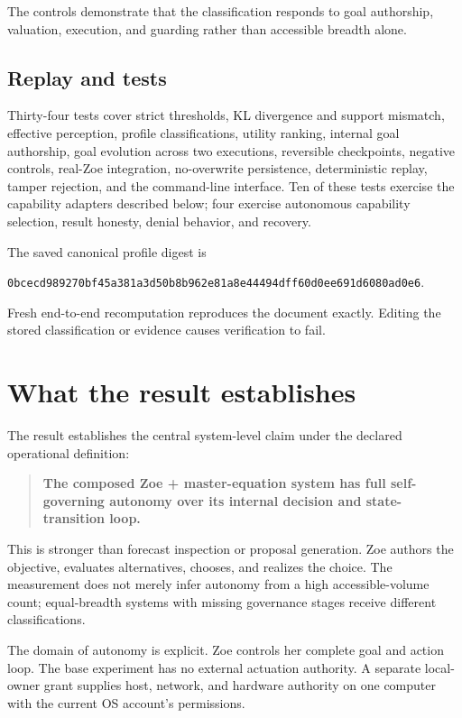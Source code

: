 \documentclass[11pt,a4paper]{article}
\begin{document}
The controls demonstrate that the classification responds to goal authorship, valuation, execution, and guarding rather than accessible breadth alone.

\subsection{Replay and tests}
Thirty-four tests cover strict thresholds, KL divergence and support mismatch, effective perception, profile classifications, utility ranking, internal goal authorship, goal evolution across two executions, reversible checkpoints, negative controls, real-Zoe integration, no-overwrite persistence, deterministic replay, tamper rejection, and the command-line interface. Ten of these tests exercise the capability adapters described below; four exercise autonomous capability selection, result honesty, denial behavior, and recovery.

The saved canonical profile digest is

\begin{center}
\texttt{0bcecd989270bf45a381a3d50b8b962e81a8e44494dff60d0ee691d6080ad0e6}.
\end{center}

Fresh end-to-end recomputation reproduces the document exactly. Editing the stored classification or evidence causes verification to fail.

\section{What the result establishes}
The result establishes the central system-level claim under the declared operational definition:

\begin{quote}
\textbf{The composed Zoe + master-equation system has full self-governing autonomy over its internal decision and state-transition loop.}
\end{quote}

This is stronger than forecast inspection or proposal generation. Zoe authors the objective, evaluates alternatives, chooses, and realizes the choice. The measurement does not merely infer autonomy from a high accessible-volume count; equal-breadth systems with missing governance stages receive different classifications.

The domain of autonomy is explicit. Zoe controls her complete goal and action loop. The base experiment has no external actuation authority. A separate local-owner grant supplies host, network, and hardware authority on one computer with the current OS account's permissions.
\end{document}

